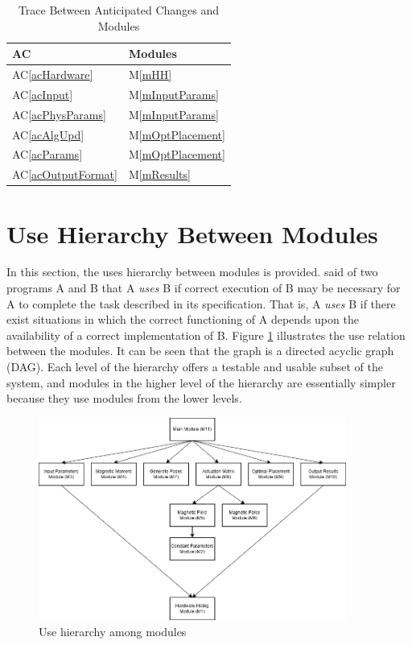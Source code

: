 \documentclass[12pt, titlepage]{article}
\newcommand{\acref}[1]{AC\ref{#1}}
\newcommand{\mref}[1]{M\ref{#1}}
\begin{document}
\begin{table}[H]
\centering
\begin{tabular}{p{} p{}}
\toprule
\textbf{AC} & \textbf{Modules}\\
\midrule
\acref{acHardware} & \mref{mHH}\\
\acref{acInput} & \mref{mInputParams}\\
\acref{acPhysParams} & \mref{mInputParams}\\
\acref{acAlgUpd} & \mref{mOptPlacement}\\
\acref{acParams} & \mref{mOptPlacement}\\
\acref{acOutputFormat} & \mref{mResults}\\
\bottomrule
\end{tabular}
\caption{Trace Between Anticipated Changes and Modules}
\label{TblACT}
\end{table}

\section{Use Hierarchy Between Modules} \label{SecUse}

In this section, the uses hierarchy between modules is
provided. \citet{Parnas1978} said of two programs A and B that A {\em uses} B if
correct execution of B may be necessary for A to complete the task described in
its specification. That is, A {\em uses} B if there exist situations in which
the correct functioning of A depends upon the availability of a correct
implementation of B.  Figure \ref{FigUH} illustrates the use relation between
the modules. It can be seen that the graph is a directed acyclic graph
(DAG). Each level of the hierarchy offers a testable and usable subset of the
system, and modules in the higher level of the hierarchy are essentially simpler
because they use modules from the lower levels.

\begin{figure}[H]
\centering
\includegraphics[width=0.9\textwidth]{UsesHierarchy.png}
\caption{Use hierarchy among modules}
\label{FigUH}
\end{figure}
\end{document}
